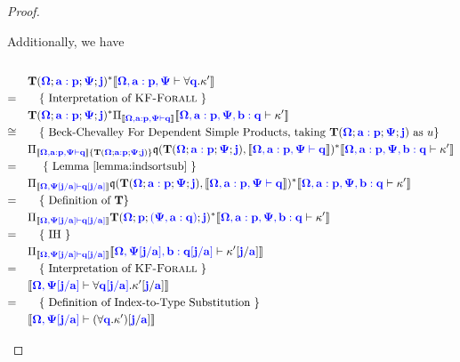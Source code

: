 \documentclass[sigplan,10pt,review,anonymous]{acmart}
\newcommand{\blu}[1]{\textbf{\color{blue}{#1}}}
\newcommand{\blum}[1]{\mathbf{\color{blue}{#1}}}
\newcommand{\sem}[1]{\llbracket #1 \rrbracket}
\newcommand{\mbf}[1]{\mathbf{#1}}
\begin{document}
\begin{proof}
\begin{description}
Additionally, we have\\~\\
\begin{align*}
 &\quad \mbf{T}(\blum{\Omega} ; \blum{a : p} ; \blum{\Psi} ; \blu{j})^* \sem{\blum{\Omega,a:p,\Psi} \vdash \forall \blum{q}. \kappa'}\\
=&\qquad \text{\{ Interpretation of \begin{sc}KF-Forall\end{sc} \}} \\
 &\quad \mbf{T}(\blum{\Omega} ; \blum{a : p} ; \blum{\Psi} ; \blu{j})^* \Pi_{\sem{\blum{\Omega, a : p, \Psi \vdash q}}} \sem{\blum{\Omega,a:p,\Psi,b:q} \vdash \kappa'}\\
\cong&\qquad \text{\{ Beck-Chevalley For Dependent Simple Products, taking } \mbf{T}(\blum{\Omega} ; \blum{a : p} ; \blum{\Psi} ; \blu{j}) \text{ as } u \}\\
 &\quad \Pi_{ \sem{\blum{\Omega, a : p, \Psi \vdash q}} \{ \mbf{T}(\blum{\Omega} ; \blum{a : p} ; \blum{\Psi} ; \blu{j}) \} } \frak q(\mbf{T}(\blum{\Omega} ; \blum{a : p} ; \blum{\Psi} ; \blu{j}) , \sem{\blum{\Omega, a:p, \Psi \vdash q}})^* \sem{\blum{\Omega,a:p,\Psi,b : q} \vdash \kappa'}\\
=&\qquad \text{ \{ Lemma \ref{lemma:indsortsub} \}}\\
 &\quad \Pi_{ \sem{\blum{\Omega, \Psi[j/a] \vdash q[j/a]}} } \frak q(\mbf{T}(\blum{\Omega} ; \blum{a : p} ; \blum{\Psi} ; \blu{j}) , \sem{\blum{\Omega, a:p, \Psi \vdash q}})^* \sem{\blum{\Omega,a:p,\Psi,b:q} \vdash \kappa'}\\
=&\qquad \text{\{ Definition of } \mbf{T} \}\\
 &\quad \Pi_{ \sem{\blum{\Omega, \Psi[j/a] \vdash q[j/a]}} } \mbf T(\blum{\Omega}; \blum{p} ; \blum{(\Psi, a : q)}; \blum{j})^* \sem{\blum{\Omega,a:p,\Psi,b:q} \vdash \kappa'}\\
=&\qquad \text{\{ IH \}} \\ 
 &\quad \Pi_{ \sem{\blum{\Omega, \Psi[j/a] \vdash q[j/a]}} } \sem{\blum{\Omega,\Psi[j/a],b:q[j/a]} \vdash \kappa'[\blum{j}/\blum{a}]}\\
=&\qquad \text{\{ Interpretation of \begin{sc}KF-Forall\end{sc} \}}\\
 &\quad \sem{\blum{\Omega,\Psi[j/a]} \vdash \forall \blum{q[j/a]}. \kappa'[\blum{j}/\blum{a}]}\\
=&\qquad \text{\{ Definition of Index-to-Type Substitution \}}\\
 &\quad \sem{\blum{\Omega,\Psi[j/a]} \vdash (\forall \blum{q}. \kappa')[\blum{j}/\blum{a}]}
\end{align*}


\end{description}
\end{proof}
\end{document}
